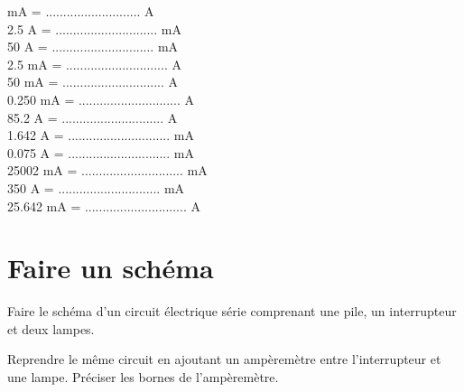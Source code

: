 \documentclass[a4paper,11pt]{exam}
\begin{document}
\begin{multicols}{2}
	\begin{questions}
		 mA = ........................... A \\
		
		\question \num{2.5} A = ............................. mA \\
		
		\question \num{50} A = ............................. mA \\
		
		\question \num{2.5} mA = ............................. A\\
		
		\question \num{50} mA = ............................. A\\
		
		\question \num{0.250} mA = ............................. A\\
		
		\question \num{85.2} A = ............................. A\\
		
		\question \num{1.642} A = ............................. mA\\
		
		\question \num{0.075} A = ............................. mA	\\
		
		\question \num{25002} mA = ............................. mA	\\
		
		\question \num{350} A = ............................. mA\\
		
		\question \num{25.642} mA = ............................. A\\
	\end{questions}
	
\end{multicols}

\newpage


\section{Faire un schéma}
 
 \begin{questions}
 	\question Faire le schéma d'un circuit électrique série comprenant une pile, un interrupteur et deux lampes.
 	
 	
 	\makeemptybox{7cm}
 	
 	
 	\question Reprendre le même circuit en ajoutant un ampèremètre entre l'interrupteur et une lampe. Préciser les bornes de l'ampèremètre.
 	
 	\makeemptybox{7cm}
 \end{questions}
 
%
\ \label{LastPage}
\end{document}
